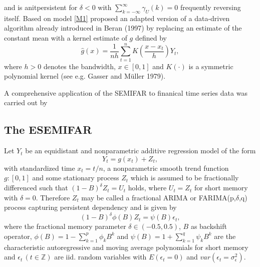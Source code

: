 \documentclass[12pt]{article}
\begin{document}
and is anitpersistent for \(\delta < 0\) with \( \sum_{k=-\infty}^{\infty} \gamma_{U}(k) = 0  \) frequently reversing itself. Based on model \eqref{M1} \citet{beran2002semifar} proposed an adapted version of  a data-driven algorithm already introduced in Beran (1997) by replacing an estimate of the constant mean with a kernel estimate of $g$ defined by
\begin{equation}
	\hat{g}(x) = \frac{1}{nh}\sum_{t=1}^{n}K(\frac{x-x_t}{h})Y_t,
\end{equation}
where $h>0$ denotes the bandwidth, $x\in[0,1]$ and $K(\cdot)$ is a symmetric polynomial kernel (see e.g. Gasser and M\"uller 1979). 

A comprehensive application of the SEMIFAR to finanical time series data was carried out by 

\subsection{The ESEMIFAR}
 
Let \(Y_{t}\) be an equidistant and nonparametric additive regression model of the form
\begin{equation}
\label{eq:Start}
Y_{t} = g(x_{t}) + Z_{t},
\end{equation} 
with standardized time \(x_t = t/n\), a nonparametric smooth trend function \(g:[0,1]\) and some stationary process \(Z_t\) which is assumed to be fractionally differenced such that \((1-B)^{\delta}Z_t =U_t\) holds, where \(U_t = Z_t\) for short memory with \(\delta = 0\).
Therefore \(Z_t\) may be called a  fractional ARIMA or FARIMA(p,\(\delta\),q) process capturing persistent dependency and is given by 
\begin{equation}
\label{eq:FARIMA}
	(1-B)^{\delta}\phi(B) Z_{t} = \psi(B) \epsilon_{t}, 
\end{equation}
where the fractional memory parameter \( \delta \in (-0.5,0.5) \),
 \(B\) as backshift operator, \( \phi(B) = 1 - \sum_{k=1}^{p} \phi_{k} B^k \) and \( \psi(B) = 1 + \sum_{k=1}^{q} \psi_{k} B^k \) are the characteristic autoregressive and moving average polynomials for short memory and \( \epsilon_{t} \, (t \in \mathbb{Z}) \)  are iid. random variables with \(E(\epsilon_{t} = 0)\) and \(var(\epsilon_{t} = \sigma_{\epsilon}^{2})\).
 
\end{document}
